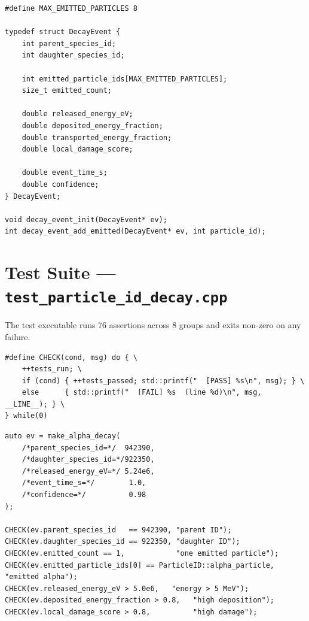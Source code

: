 \documentclass[11pt,a4paper]{article}
\begin{document}
\begin{lstlisting}[style=clang, caption={\texttt{legacy/c\_api/decay\_event.h}}]
#define MAX_EMITTED_PARTICLES 8

typedef struct DecayEvent {
    int parent_species_id;
    int daughter_species_id;

    int emitted_particle_ids[MAX_EMITTED_PARTICLES];
    size_t emitted_count;

    double released_energy_eV;
    double deposited_energy_fraction;
    double transported_energy_fraction;
    double local_damage_score;

    double event_time_s;
    double confidence;
} DecayEvent;

void decay_event_init(DecayEvent* ev);
int decay_event_add_emitted(DecayEvent* ev, int particle_id);
\end{lstlisting}

\section{Test Suite --- \texttt{test\_particle\_id\_decay.cpp}}
\label{sec:tests}

The test executable runs 76 assertions across 8 groups and exits
non-zero on any failure.

\begin{lstlisting}[style=cpp20, caption={Test harness macro and structure}]
#define CHECK(cond, msg) do { \
    ++tests_run; \
    if (cond) { ++tests_passed; std::printf("  [PASS] %s\n", msg); } \
    else      { std::printf("  [FAIL] %s  (line %d)\n", msg, __LINE__); } \
} while(0)
\end{lstlisting}

\begin{lstlisting}[style=cpp20, caption={Alpha decay test --- Pu-239 to U-235}]
auto ev = make_alpha_decay(
    /*parent_species_id=*/  942390,
    /*daughter_species_id=*/922350,
    /*released_energy_eV=*/ 5.24e6,
    /*event_time_s=*/        1.0,
    /*confidence=*/          0.98
);

CHECK(ev.parent_species_id   == 942390, "parent ID");
CHECK(ev.daughter_species_id == 922350, "daughter ID");
CHECK(ev.emitted_count == 1,            "one emitted particle");
CHECK(ev.emitted_particle_ids[0] == ParticleID::alpha_particle, "emitted alpha");
CHECK(ev.released_energy_eV > 5.0e6,   "energy > 5 MeV");
CHECK(ev.deposited_energy_fraction > 0.8,   "high deposition");
CHECK(ev.local_damage_score > 0.8,          "high damage");
\end{lstlisting}
\end{document}
